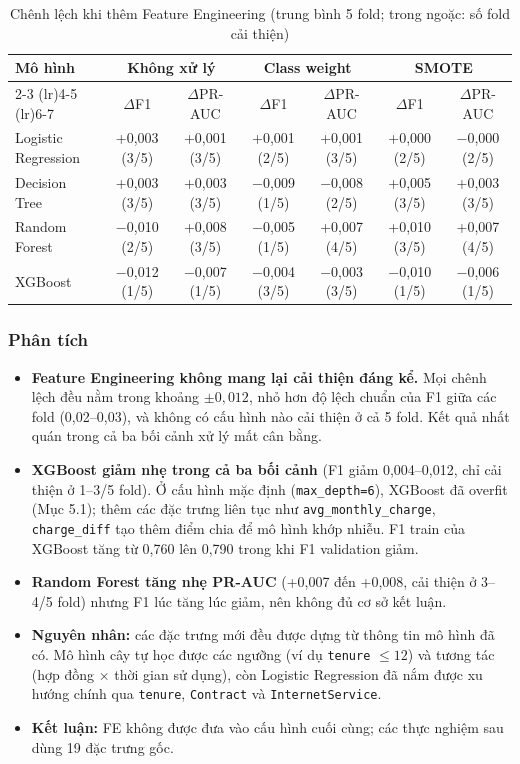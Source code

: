 \begin{table}[H]
\centering
\small
\begin{tabular}{lcccccc}
\toprule
\multirow{2}{*}{\textbf{Mô hình}} & \multicolumn{2}{c}{\textbf{Không xử lý}} & \multicolumn{2}{c}{\textbf{Class weight}} & \multicolumn{2}{c}{\textbf{SMOTE}} \\
\cmidrule(lr){2-3} \cmidrule(lr){4-5} \cmidrule(lr){6-7}
 & $\Delta$F1 & $\Delta$PR-AUC & $\Delta$F1 & $\Delta$PR-AUC & $\Delta$F1 & $\Delta$PR-AUC \\
\midrule
Logistic Regression & +0,003 (3/5) & +0,001 (3/5) & +0,001 (2/5) & +0,001 (3/5) & +0,000 (2/5) & $-$0,000 (2/5) \\
Decision Tree & +0,003 (3/5) & +0,003 (3/5) & $-$0,009 (1/5) & $-$0,008 (2/5) & +0,005 (3/5) & +0,003 (3/5) \\
Random Forest & $-$0,010 (2/5) & +0,008 (3/5) & $-$0,005 (1/5) & +0,007 (4/5) & +0,010 (3/5) & +0,007 (4/5) \\
XGBoost & $-$0,012 (1/5) & $-$0,007 (1/5) & $-$0,004 (3/5) & $-$0,003 (3/5) & $-$0,010 (1/5) & $-$0,006 (1/5) \\
\bottomrule
\end{tabular}
\caption{Chênh lệch khi thêm Feature Engineering (trung bình 5 fold; trong ngoặc: số fold cải thiện)}
\label{tab:fe}
\end{table}

\subsubsection{Phân tích}
\begin{itemize}
    \item \textbf{Feature Engineering không mang lại cải thiện đáng kể.} Mọi chênh lệch đều nằm trong khoảng $\pm 0{,}012$, nhỏ hơn độ lệch chuẩn của F1 giữa các fold (0,02--0,03), và không có cấu hình nào cải thiện ở cả 5 fold. Kết quả nhất quán trong cả ba bối cảnh xử lý mất cân bằng.
    \item \textbf{XGBoost giảm nhẹ trong cả ba bối cảnh} (F1 giảm 0,004--0,012, chỉ cải thiện ở 1--3/5 fold). Ở cấu hình mặc định (\texttt{max\_depth=6}), XGBoost đã overfit (Mục 5.1); thêm các đặc trưng liên tục như \texttt{avg\_monthly\_charge}, \texttt{charge\_diff} tạo thêm điểm chia để mô hình khớp nhiễu. F1 train của XGBoost tăng từ 0,760 lên 0,790 trong khi F1 validation giảm.
    \item \textbf{Random Forest tăng nhẹ PR-AUC} (+0,007 đến +0,008, cải thiện ở 3--4/5 fold) nhưng F1 lúc tăng lúc giảm, nên không đủ cơ sở kết luận.
    \item \textbf{Nguyên nhân:} các đặc trưng mới đều được dựng từ thông tin mô hình đã có. Mô hình cây tự học được các ngưỡng (ví dụ \texttt{tenure} $\le 12$) và tương tác (hợp đồng $\times$ thời gian sử dụng), còn Logistic Regression đã nắm được xu hướng chính qua \texttt{tenure}, \texttt{Contract} và \texttt{InternetService}.
    \item \textbf{Kết luận:} FE không được đưa vào cấu hình cuối cùng; các thực nghiệm sau dùng 19 đặc trưng gốc.
\end{itemize}

